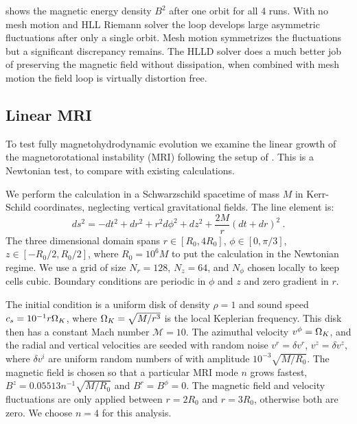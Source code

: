  shows the magnetic energy density $B^2$ after one orbit for all 4 runs.  With no mesh motion and HLL Riemann solver the loop develops large asymmetric fluctuations after only a single orbit.  Mesh motion symmetrizes the fluctuations but a significant discrepancy remains.  The HLLD solver does a much better job of preserving the magnetic field without dissipation, when combined with mesh motion the field loop is virtually distortion free.

\subsection{Linear MRI}

To test fully magnetohydrodynamic evolution we examine the linear growth of the magnetorotational instability (MRI) following the setup of \citet{Flock10}.  This is a Newtonian test, to compare with existing calculations.  

We perform the calculation in a Schwarzschild spacetime of mass $M$ in Kerr-Schild coordinates, neglecting vertical gravitational fields.  The line element is:
\begin{equation}
	ds^2 = -dt^2 + dr^2 + r^2d\phi^2 + dz^2 + \frac{2M}{r}\left(dt + dr\right)^2\ .
\end{equation}
The three dimensional domain spans $r\in[R_0, 4R_0]$, $\phi \in [0, \pi/3]$, $z\in[-R_0/2, R_0/2]$, where $R_0 = 10^6M$ to put the calculation in the Newtonian regime.  We use a grid of size $N_r = 128$, $N_z=64$, and $N_\phi$ chosen locally to keep cells cubic.  Boundary conditions are periodic in $\phi$ and $z$ and zero gradient in $r$.

The initial condition is a uniform disk of density $\rho=1$ and sound speed $c_s = 10^{-1} r \Omega_K$, where $\Omega_K = \sqrt{M/r^3}$ is the local Keplerian frequency. This disk then has a constant Mach number $\mathcal{M} = 10$.  The azimuthal velocity $v^\phi = \Omega_K$, and the radial and vertical velocities are seeded with random noise $ v^r = \delta v^r$, $v^z=\delta v^z$, where $\delta v^i$ are uniform random numbers of with amplitude $10^{-3} \sqrt{M/R_0}$.  The magnetic field is chosen so that a particular MRI mode $n$ grows fastest, $B^z = 0.05513 n^{-1} \sqrt{M/R_0}$ and $B^r = B^\phi = 0$.  The magnetic field and velocity fluctuations are only applied between $r=2R_0$ and $r=3R_0$, otherwise both are zero.  We choose $n=4$ for this analysis.

